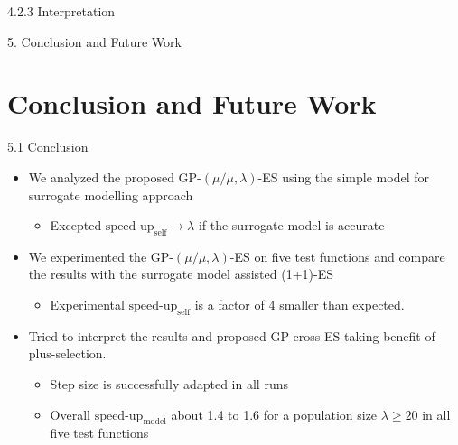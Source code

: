 \documentclass{beamer}
\begin{document}
\begin{frame}{4.2.3 Interpretation}


\end{frame}

\begin{frame}[plain,c]
\begin{center}
\Huge 5. Conclusion and Future Work
\end{center}
\end{frame}
\section{Conclusion and Future Work}
\begin{frame}{5.1 Conclusion}
  \begin{itemize}
  \item
    We analyzed the proposed GP-$(\mu/\mu,\lambda)$-ES using the simple model for surrogate modelling approach
    \begin{itemize}
        \item Excepted $\text{speed-up}_{\text{self}}\rightarrow \lambda$ if the surrogate model is accurate
    \end{itemize}
  \item
    We experimented the GP-$(\mu/\mu,\lambda)$-ES on five test functions and compare the results with the surrogate model assisted (1+1)-ES
    \begin{itemize}
        \item Experimental $\text{speed-up}_{\text{self}}$ is a factor of 4 smaller than expected. 
    \end{itemize}
  \item
    Tried to interpret the results and proposed GP-cross-ES taking benefit of plus-selection.
    \begin{itemize}
        \item Step size is successfully adapted in all runs
        \item Overall $\text{speed-up}_{\text{model}}$ about 1.4 to 1.6 for a population size $\lambda \geq 20$ in all five test functions
    \end{itemize}
  \end{itemize}
  
\end{frame}
\end{document}
